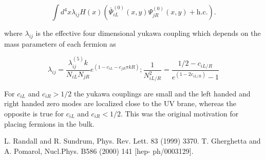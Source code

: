 \documentclass[aps,onecolumn,twoside,secnumarabic,balancelastpage,amsmath,amssymb,nofootinbib,hyperref=pdftex]{revtex4}
\begin{document}
\begin{equation}
\int d^{4}x\lambda_{ij}H(x)(\bar{\Psi}^{(0)}_{iL}(x,y)\Psi^{(0)}_{jR}(x,y) + \text{h.c.}).
\end{equation}

where $\lambda_{ij}$ is the effective four dimensional yukawa coupling which depends on the mass parameters of each fermion as

\begin{equation}
\lambda_{ij} = \frac{\lambda^{(5)}_{ij}k}{N_{iL}N_{jR}}e^{(1 - c_{iL} - c_{jR}\pi kR)}; \frac{1}{N^{2}_{iL/R}} = \frac{1/2 - c_{iL/R}}{e^{(1-2c_{iL/R})} - 1}
\end{equation}

For $c_{iL}$ and $c_{iR} > 1/2$ the yukawa couplings are small and the left handed and right handed zero modes are localized close to the UV brane, whereas the opposite is true for $c_{iL}$ and $c_{iR} < 1/2$. This was the original motivation for placing fermions in the bulk. 



\begin{thebibliography}{9} 
 L. Randall and R. Sundrum, Phys. Rev. Lett. 83 (1999) 3370.
 T. Gherghetta and A. Pomarol, Nucl.Phys. B586 (2000) 141 [hep- ph/0003129].
\end{thebibliography}
\end{document}
